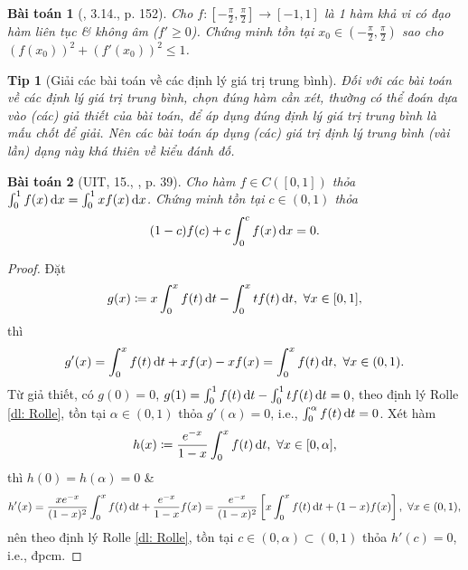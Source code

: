 \documentclass{article}
\newtheorem{baitoan}{Bài toán}
\newtheorem{tip}{Tip}
\begin{document}
\begin{baitoan}[\cite{Quoc_Long_Dat_Nam_VMC}, 3.14., p. 152]
	Cho $f:\left[-\frac{\pi}{2},\frac{\pi}{2}\right]\to[-1,1]$ là 1 hàm khả vi có đạo hàm liên tục \& không âm ($f'\ge0$). Chứng minh tồn tại $x_0\in\left(-\frac{\pi}{2},\frac{\pi}{2}\right)$ sao cho $(f(x_0))^2 + (f'(x_0))^2\le1$.
\end{baitoan}

\begin{tip}[Giải các bài toán về các định lý giá trị trung bình]
	Đối với các bài toán về các định lý giá trị trung bình, chọn đúng hàm cần xét, thường có thể đoán dựa vào (các) giả thiết của bài toán, để áp dụng đúng định lý giá trị trung bình là mấu chốt để giải. Nên các bài toán áp dụng (các) giá trị định lý trung bình (vài lần) dạng này khá thiên về kiểu đánh đố.
\end{tip}

\begin{baitoan}[UIT, 15., \cite{VMS_VMC2025}, p. 39]
	Cho hàm $f\in C([0,1])$ thỏa $\int_0^1 f(x)\,{\rm d}x = \int_0^1 xf(x)\,{\rm d}x$. Chứng minh tồn tại $c\in(0,1)$ thỏa
	\begin{equation*}
		(1 - c)f(c) + c\int_0^c f(x)\,{\rm d}x = 0.
	\end{equation*}
\end{baitoan}

\begin{proof}
	Đặt
	\begin{equation*}
		g(x)\coloneqq x\int_0^x f(t)\,{\rm d}t - \int_0^x tf(t)\,{\rm d}t,\ \forall x\in[0,1],
	\end{equation*}
	thì
	\begin{equation*}
		g'(x) = \int_0^x f(t)\,{\rm d}t + xf(x) - xf(x) = \int_0^x f(t)\,{\rm d}t,\ \forall x\in(0,1).
	\end{equation*}
	Từ giả thiết, có $g(0) = 0$, $g(1) = \int_0^1 f(t)\,{\rm d}t  - \int_0^1 tf(t)\,{\rm d}t = 0$, theo định lý Rolle \ref{dl: Rolle}, tồn tại $\alpha\in(0,1)$ thỏa $g'(\alpha) = 0$, i.e., $\int_0^\alpha f(t)\,{\rm d}t = 0$. Xét hàm
	\begin{equation*}
		h(x)\coloneqq\frac{e^{-x}}{1 - x}\int_0^x f(t)\,{\rm d}t,\ \forall x\in[0,\alpha],
	\end{equation*}
	thì $h(0) = h(\alpha) = 0$ \&
	\begin{equation*}
		h'(x) = \frac{xe^{-x}}{(1 - x)^2}\int_0^x f(t)\,{\rm d}t + \frac{e^{-x}}{1 - x}f(x) = \frac{e^{-x}}{(1 - x)^2}\left[x\int_0^x f(t)\,{\rm d}t + (1 - x)f(x)\right],\ \forall x\in(0,1),
	\end{equation*}
	nên theo định lý Rolle \ref{dl: Rolle}, tồn tại $c\in(0,\alpha)\subset(0,1)$ thỏa $h'(c) = 0$, i.e., đpcm.
\end{proof}
\end{document}
